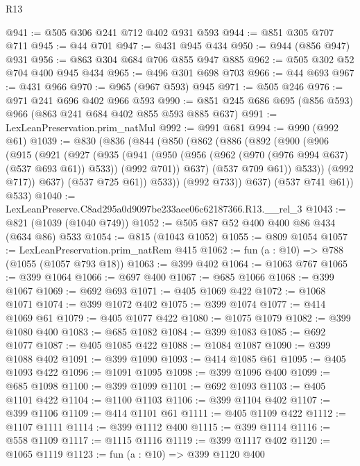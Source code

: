 \begin{lexlean}{R13}
\begin{coremodule}
@941 := @505 @306 @241 @712 @402 @931 @593
@944 := @851 @305 @707 @711
@945 := @44 @701
@947 := @431 @945 @434
@950 := @944 (@856 @947) @931
@956 := @863 @304 @684 @706 @855 @947 @885
@962 := @505 @302 @52 @704 @400 @945 @434
@965 := @496 @301 @698 @703
@966 := @44 @693
@967 := @431 @966
@970 := @965 (@967 @593) @945
@971 := @505 @246
@976 := @971 @241 @696 @402 @966 @593
@990 := @851 @245 @686 @695 (@856 @593) @966 (@863 @241 @684 @402 @855 @593 @885 @637)
@991 := LexLeanPreservation.prim_natMul
@992 := @991 @681
@994 := @990 (@992 @61)
@1039 := @830
    (@836
      (@844
        (@850
          (@862
            (@886
              (@892
                (@900
                  (@906
                    (@915
                      (@921
                        (@927
                          (@935
                            (@941
                              (@950
                                (@956 (@962 (@970 (@976 @994 @637) (@537 @693 @61)) @533))
                                (@992 @701))
                              @637)
                            (@537 @709 @61))
                          @533))
                      (@992 @717))
                    @637)
                  (@537 @725 @61))
                @533))
            (@992 @733))
          @637)
        (@537 @741 @61))
      @533)
@1040 := LexLeanPreserve.C8ad295a0d9097be233aee06c62187366.R13.__rel_3
@1043 := @821 (@1039 (@1040 @749))
@1052 := @505 @87 @52 @400 @400 @86 @434 (@634 @86) @533
@1054 := @815 (@1043 @1052)
@1055 := @809 @1054
@1057 := LexLeanPreservation.prim_natRem @415
@1062 := fun (a : @10) => @788 (@1055 (@1057 @793 @18))
@1063 := @399 @402
@1064 := @1063 @767
@1065 := @399 @1064
@1066 := @697 @400
@1067 := @685 @1066
@1068 := @399 @1067
@1069 := @692 @693
@1071 := @405 @1069 @422
@1072 := @1068 @1071
@1074 := @399 @1072 @402
@1075 := @399 @1074
@1077 := @414 @1069 @61
@1079 := @405 @1077 @422
@1080 := @1075 @1079
@1082 := @399 @1080 @400
@1083 := @685 @1082
@1084 := @399 @1083
@1085 := @692 @1077
@1087 := @405 @1085 @422
@1088 := @1084 @1087
@1090 := @399 @1088 @402
@1091 := @399 @1090
@1093 := @414 @1085 @61
@1095 := @405 @1093 @422
@1096 := @1091 @1095
@1098 := @399 @1096 @400
@1099 := @685 @1098
@1100 := @399 @1099
@1101 := @692 @1093
@1103 := @405 @1101 @422
@1104 := @1100 @1103
@1106 := @399 @1104 @402
@1107 := @399 @1106
@1109 := @414 @1101 @61
@1111 := @405 @1109 @422
@1112 := @1107 @1111
@1114 := @399 @1112 @400
@1115 := @399 @1114
@1116 := @558 @1109
@1117 := @1115 @1116
@1119 := @399 @1117 @402
@1120 := @1065 @1119
@1123 := fun (a : @10) => @399 @1120 @400

\end{coremodule}
\end{lexlean}

